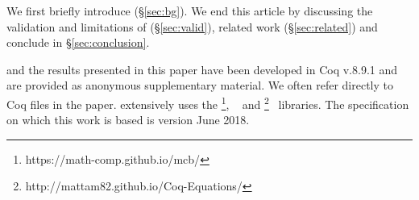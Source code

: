 We first briefly introduce \gql (\S\ref{sec:bg}). 
We end this article by discussing the validation and limitations of \gcoql (\S\ref{sec:valid}), related work (\S\ref{sec:related}) and conclude in \S\ref{sec:conclusion}.

\gcoql and the results presented in this paper have been developed in Coq v.8.9.1 and are provided as anonymous supplementary material. We often refer directly to Coq files in the paper. \gcoql extensively uses the 
\mathcomp\footnote{https://math-comp.github.io/mcb/}, \ssreflect~\cite{ssreflect} and \equations\footnote{http://mattam82.github.io/Coq-Equations/}~\cite{equations} libraries. 
The \gql specification on which this work is based is version June 2018.





